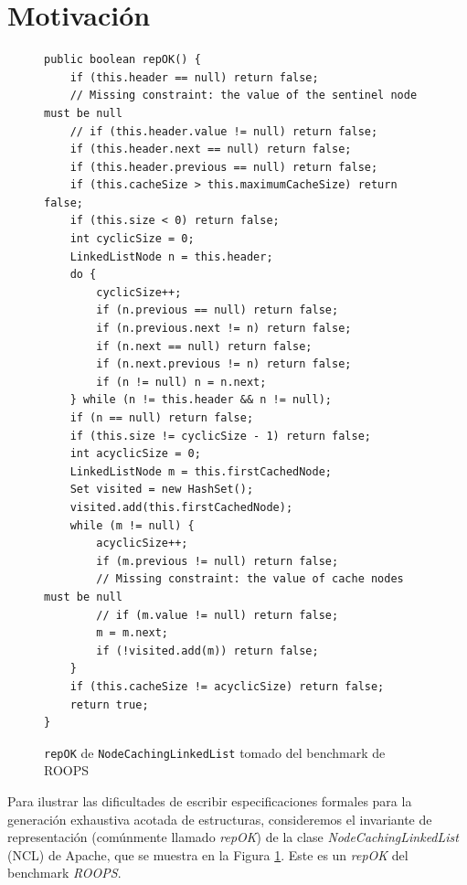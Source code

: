 \section[Motivación]{Motivación}
\label{sec:motivating-example}


\begin{figure}[!thb]
\begin{lstlisting}
public boolean repOK() {
    if (this.header == null) return false;
    // Missing constraint: the value of the sentinel node must be null  
    // if (this.header.value != null) return false;
    if (this.header.next == null) return false;
    if (this.header.previous == null) return false;
    if (this.cacheSize > this.maximumCacheSize) return false;
    if (this.size < 0) return false;
    int cyclicSize = 0;
    LinkedListNode n = this.header;
    do {
        cyclicSize++;
        if (n.previous == null) return false;
        if (n.previous.next != n) return false;
        if (n.next == null) return false;
        if (n.next.previous != n) return false;
        if (n != null) n = n.next;
    } while (n != this.header && n != null);
    if (n == null) return false;
    if (this.size != cyclicSize - 1) return false;
    int acyclicSize = 0;
    LinkedListNode m = this.firstCachedNode;
    Set visited = new HashSet();
    visited.add(this.firstCachedNode);
    while (m != null) {
        acyclicSize++;
        if (m.previous != null) return false;
        // Missing constraint: the value of cache nodes must be null
        // if (m.value != null) return false;
        m = m.next;
        if (!visited.add(m)) return false;
    }
    if (this.cacheSize != acyclicSize) return false;
    return true;
}
\end{lstlisting}
\caption{\texttt{repOK} de \texttt{NodeCachingLinkedList} tomado del benchmark de \textsf{ROOPS}}
\label{fig:NCL-repOK}
\end{figure}

Para ilustrar las dificultades de escribir especificaciones formales para la generación exhaustiva acotada de estructuras, 
consideremos el invariante de representación (comúnmente llamado \emph{repOK}) de la clase \emph{NodeCachingLinkedList} (NCL) de Apache, que se muestra en la Figura \ref{fig:NCL-repOK}.
Este es un \emph{repOK} del benchmark \emph{ROOPS}. 

